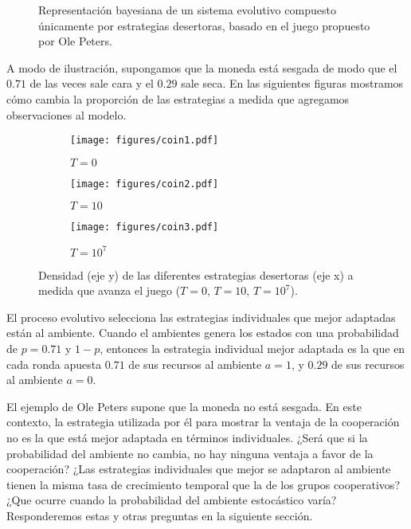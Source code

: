 \documentclass[a4paper,10pt]{article}
\begin{document}
\begin{figure}[H]
\centering
{}
\caption{Representación bayesiana de un sistema evolutivo compuesto únicamente por estrategias desertoras, basado en el juego propuesto por Ole Peters.}
\label{fig:modelo_beta_binomial}
\end{figure}
%
A modo de ilustración, supongamos que la moneda está sesgada de modo que el $0.71$ de las veces sale cara y el $0.29$ sale seca.
En las siguientes figuras mostramos cómo cambia la proporción de las estrategias a medida que agregamos observaciones al modelo.
%
\begin{figure}[H]
    \centering
    \begin{subfigure}[b]{0.32\textwidth}
    \texttt{[image: figures/coin1.pdf]}
    \caption{$T = 0$}
    \end{subfigure}
    \begin{subfigure}[b]{0.32\textwidth}
    \texttt{[image: figures/coin2.pdf]}
    \caption{$T = 10$}
    \end{subfigure}
    \begin{subfigure}[b]{0.32\textwidth}
    \texttt{[image: figures/coin3.pdf]}
    \caption{$T = 10^7$}
    \end{subfigure}
    \caption{Densidad (eje y) de las diferentes estrategias desertoras (eje x) a medida que avanza el juego ($T=0, \, T=10, \, T=10^7$).}
    \label{fig:estrategias_individuales}
\end{figure}

El proceso evolutivo selecciona las estrategias individuales que mejor adaptadas están al ambiente.
Cuando el ambientes genera los estados con una probabilidad de $p=0.71$ y $1-p$, entonces la estrategia individual mejor adaptada es la que en cada ronda apuesta $0.71$ de sus recursos al ambiente $a=1$, y $0.29$ de sus recursos al ambiente $a=0$.


El ejemplo de Ole Peters supone que la moneda no está sesgada.
En este contexto, la estrategia utilizada por él para mostrar la ventaja de la cooperación no es la que está mejor adaptada en términos individuales.
¿Será que si la probabilidad del ambiente no cambia, no hay ninguna ventaja a favor de la cooperación?
¿Las estrategias individuales que mejor se adaptaron al ambiente tienen la misma tasa de crecimiento temporal que la de los grupos cooperativos?
¿Que ocurre cuando la probabilidad del ambiente estocástico varía? 
Responderemos estas y otras preguntas en la siguiente sección.
\end{document}
